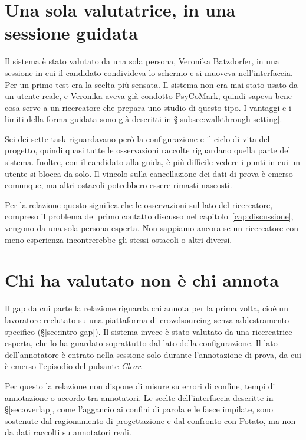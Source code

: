 \documentclass[]{sapthesis}
\begin{document}
\section{Una sola valutatrice, in una sessione guidata}
\label{sec:lim-sessione}

Il sistema è stato valutato da una sola persona, Veronika Batzdorfer, in una sessione in cui il candidato condivideva lo schermo e si muoveva nell'interfaccia. Per un primo test era la scelta più sensata. Il sistema non era mai stato usato da un utente reale, e Veronika aveva già condotto PsyCoMark, quindi sapeva bene cosa serve a un ricercatore che prepara uno studio di questo tipo. I vantaggi e i limiti della forma guidata sono già descritti in \S\ref{subsec:walkthrough-setting}.

Sei dei sette task riguardavano però la configurazione e il ciclo di vita del progetto, quindi quasi tutte le osservazioni raccolte riguardano quella parte del sistema. Inoltre, con il candidato alla guida, è più difficile vedere i punti in cui un utente si blocca da solo. Il vincolo sulla cancellazione dei dati di prova è emerso comunque, ma altri ostacoli potrebbero essere rimasti nascosti.

Per la relazione questo significa che le osservazioni sul lato del ricercatore, compreso il problema del primo contatto discusso nel capitolo~\ref{cap:discussione}, vengono da una sola persona esperta. Non sappiamo ancora se un ricercatore con meno esperienza incontrerebbe gli stessi ostacoli o altri diversi.

\section{Chi ha valutato non è chi annota}
\label{sec:lim-valutatore}

Il gap da cui parte la relazione riguarda chi annota per la prima volta, cioè un lavoratore reclutato su una piattaforma di crowdsourcing senza addestramento specifico (\S\ref{sec:intro-gap}). Il sistema invece è stato valutato da una ricercatrice esperta, che lo ha guardato soprattutto dal lato della configurazione. Il lato dell'annotatore è entrato nella sessione solo durante l'annotazione di prova, da cui è emerso l'episodio del pulsante \emph{Clear}.

Per questo la relazione non dispone di misure su errori di confine, tempi di annotazione o accordo tra annotatori. Le scelte dell'interfaccia descritte in \S\ref{sec:overlap}, come l'aggancio ai confini di parola e le fasce impilate, sono sostenute dal ragionamento di progettazione e dal confronto con Potato, ma non da dati raccolti su annotatori reali.
\end{document}
